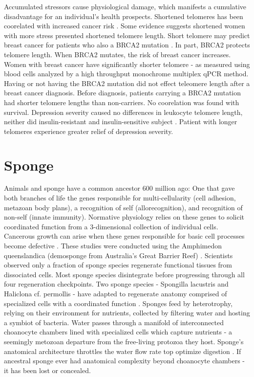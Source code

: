 \documentclass[a4paper, 11pt]{article}
\begin{document}
    Accumulated stressors cause physiological damage, which manifests a cumulative disadvantage for an individual's health prospects. Shortened telomeres has been coorelated with increased cancer risk  \cite{latham2017exploring}. Some evidence suggests shortened women with more stress presented shortened telomere length. 
    Short telomere may predict breast cancer for patients who also a BRCA2 mutation \cite{thorvaldsdottir2017telomere}. In part, BRCA2 protects telomere length. When BRCA2 mutates, the risk of breast cancer increases. Women with breast cancer have significantly shorter telomere - as measured using blood cells analyzed by a high throughput monochrome multiplex qPCR method. Having or not having the BRCA2 mutation did not effect teleomere length after a breast cancer diagnosis. Before diagnosis, patients carrying a BRCA2 mutation had shorter telomere lengths than non-carriers. No coorelation was found with survival.   Depression severity caused no differences in leukocyte telomere length, neither did insulin-resistant and insulin-sensitive subject \cite{rasgon2017insulin}. Patient with longer telomeres experience greater relief of depression severity.
    
   
   
   \section{Sponge}
Animals and sponge have a common ancestor 600 million ago: One that gave both branches of life the genes responsible for multi-cellularity (cell adhesion, metazoan body plans), a recognition of self (allorecognition), and recognition of non-self (innate immunity). Normative physiology relies on these genes to solicit coordinated function from a 3-dimensional collection of individual cells. Cancerous growth can arise when these genes responsible for basic cell processes become defective \cite{srivastava2010amphimedon}. These studies were conducted using the Amphimedon queenslandica (demosponge from Australia's Great Barrier Reef) \cite{srivastava2010amphimedon}. 
Scientists observed only a fraction of sponge species regenerate functional tissues from dissociated cells. Most sponge species disintegrate before progressing through all four regeneration checkpoints. Two sponge species - Spongilla lacustris and Haliclona cf. permollis - have adapted to regenerate anatomy comprised of specialized cells with a coordinated function \cite{eerkes2015sponge}. 
Sponges feed by heterotrophy, relying on their environment for nutrients, collected by filtering water and hosting a symbiot of bacteria. Water passes through a manifold of interconnected choanocyte chambers lined with specialized cells which capture nutrients - a seemingly metozoan departure from the free-living protozoa they host.  Sponge's anatomical architecture throttles the water flow rate top optimize digestion \cite{riesgo2014analysis}.
If ancestral sponge ever had anatomical complexity beyond choanocyte chambers - it has been lost or concealed. 
 
\end{document}
